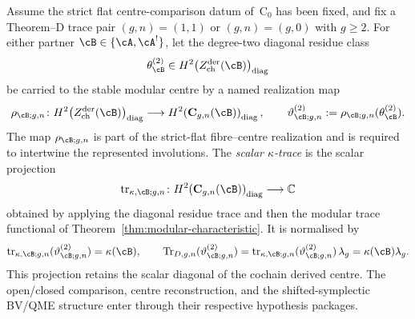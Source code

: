 \begin{definition}
\label{def:derived-centre-scalar-trace-kappa}
Assume the strict flat centre-comparison datum of~\(\mathrm{C}_0\) has
been fixed, and fix a Theorem--D trace pair
\((g,n)=(1,1)\) or \((g,n)=(g,0)\) with \(g\geq2\).  For either partner
\(\cB\in\{\cA,\cA^!\}\), let the degree-two diagonal residue class
\[
 \theta_{\cB}^{(2)}
 \in
 H^2\!\left(Z^{\mathrm{der}}_{\mathrm{ch}}(\cB)\right)_{\mathrm{diag}}
\]
be carried to the stable modular centre by a named realization map
\[
 \rho_{\cB;g,n}\colon
 H^2\!\left(Z^{\mathrm{der}}_{\mathrm{ch}}(\cB)\right)_{\mathrm{diag}}
 \longrightarrow
 H^2\!\left(\mathbf C_{g,n}(\cB)\right)_{\mathrm{diag}},
 \qquad
 \vartheta_{\cB;g,n}^{(2)}
 :=\rho_{\cB;g,n}(\theta_{\cB}^{(2)}).
\]
The map \(\rho_{\cB;g,n}\) is part of the strict-flat
fibre--centre realization and is required to intertwine the
represented involutions.  The \emph{scalar
\(\kappa\)-trace} is the scalar projection
\[
 \operatorname{tr}_{\kappa,\cB;g,n}\colon
 H^2\!\left(\mathbf C_{g,n}(\cB)\right)_{\mathrm{diag}}
 \longrightarrow \mathbb C
\]
obtained by applying the diagonal residue trace and then the modular
trace functional of Theorem~\ref{thm:modular-characteristic}.  It is
normalised by
\[
 \operatorname{tr}_{\kappa,\cB;g,n}
   (\vartheta_{\cB;g,n}^{(2)})=\kappa(\cB),
 \qquad
 \operatorname{Tr}_{D,g,n}(\vartheta_{\cB;g,n}^{(2)})
 =\operatorname{tr}_{\kappa,\cB;g,n}
   (\vartheta_{\cB;g,n}^{(2)})\,\lambda_g
 =\kappa(\cB)\lambda_g .
\]
This projection retains the scalar diagonal of the cochain derived
centre.  The open/closed comparison, centre reconstruction, and the
shifted-symplectic BV/QME structure enter through their respective
hypothesis packages.
\end{definition}

